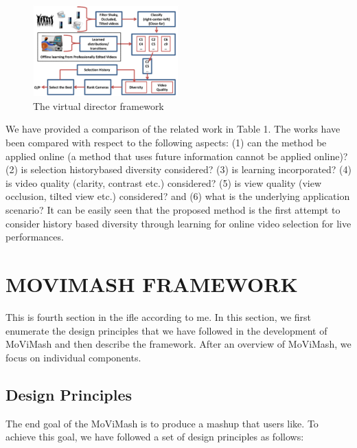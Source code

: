 \documentclass{sig-alternate}
\begin{document}
\begin{figure}[h]
    \centering
    \includegraphics[width=0.5\textwidth]{img2.png}
    \caption{The virtual director framework}
    \label{fig:mesh2}
\end{figure}


We have provided a comparison of the related work in Table 1. The works have been compared with respect to the following aspects: (1) can the method be applied online (a method that uses future information cannot be applied online)? (2) is selection historybased diversity considered? (3) is learning incorporated? (4) is video quality (clarity, contrast etc.) considered? (5) is view quality (view occlusion, tilted view etc.) considered? and (6) what is the underlying application scenario? It can be easily seen that the proposed method is the first attempt to consider history based diversity through learning for online video selection for live performances.





\section{MOVIMASH FRAMEWORK}
This is fourth section in the ifle according to me. In this section, we first enumerate the design principles that we
have followed in the development of MoViMash and then describe the framework. After an overview of MoViMash, we focus on individual components.

\subsection{Design Principles}
The end goal of the MoViMash is to produce a mashup that users like. To achieve this goal, we have followed a set of design principles as follows:
\end{document}
